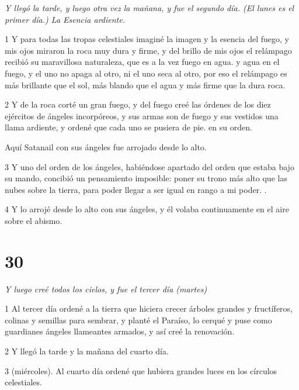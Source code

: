\par \textit{Y llegó la tarde, y luego otra vez la mañana, y fue el segundo día. (El lunes es el primer día.) La Esencia ardiente.}

\par 1 Y para todas las tropas celestiales imaginé la imagen y la esencia del fuego, y mis ojos miraron la roca muy dura y firme, y del brillo de mis ojos el relámpago recibió su maravillosa naturaleza, que es a la vez fuego en agua. y agua en el fuego, y el uno no apaga al otro, ni el uno seca al otro, por eso el relámpago es más brillante que el sol, más blando que el agua y más firme que la dura roca.

\par 2 Y de la roca corté un gran fuego, y del fuego creé las órdenes de los diez ejércitos de ángeles incorpóreos, y sus armas son de fuego y sus vestidos una llama ardiente, y ordené que cada uno se pusiera de pie. en su orden.

Aquí Satanail con sus ángeles fue arrojado desde lo alto.

\par 3 Y uno del orden de los ángeles, habiéndose apartado del orden que estaba bajo su mando, concibió un pensamiento imposible: poner su trono más alto que las nubes sobre la tierra, para poder llegar a ser igual en rango a mi poder. .

\par 4 Y lo arrojé desde lo alto con sus ángeles, y él volaba continuamente en el aire sobre el abismo.

\chapter{30}

\par \textit{Y luego creé todos los cielos, y fue el tercer día (martes)}

\par 1 Al tercer día ordené a la tierra que hiciera crecer árboles grandes y fructíferos, colinas y semillas para sembrar, y planté el Paraíso, lo cerqué y puse como guardianes ángeles llameantes armados, y así creé la renovación.

\par 2 Y llegó la tarde y la mañana del cuarto día.

\par 3 (miércoles). Al cuarto día ordené que hubiera grandes luces en los círculos celestiales.

